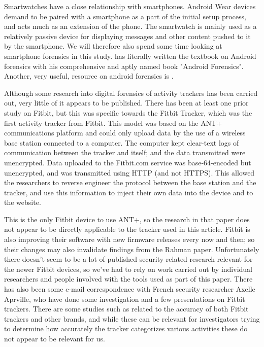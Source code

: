 \documentclass[a4paper,11pt,dvips]{article}
\begin{document}
Smartwatches have a close relationship with smartphones. Android Wear devices demand to be paired with a smartphone as a part of the initial setup process, and acts much as an extension of the phone. The smartwatch is mainly used as a relatively passive device for displaying messages and other content pushed to it by the smartphone. We will therefore also spend some time looking at smartphone forensics in this study. \cite{hoog2011android} has literally written the textbook on Android forensics with his comprehensive and aptly named book "Android Forensics". Another, very useful, resource on android forensics is \cite{vidas2011toward}.

Although some research into digital forensics of activity trackers has been carried out, very little of it appears to be published. There has been at least one prior study on Fitbit, but this was specific towards the Fitbit Tracker, which was the first activity tracker from Fitbit. This model was based on the ANT+ communications platform and could only upload data by the use of a wireless base station connected to a computer. The computer kept clear-text logs of communication between the tracker and itself; and the data transmitted were unencrypted. Data uploaded to the Fitbit.com service was base-64-encoded but unencrypted, and was transmitted using HTTP (and not HTTPS). This allowed the researchers to reverse engineer the protocol between the base station and the tracker, and use this information to inject their own data into the device and to the website. \citep{rahman2013fit}

This is the only Fitbit device to use ANT+, so the research in that paper does not appear to be directly applicable to the tracker used in this article. Fitbit is also improving their software with new firmware releases every now and then; so their changes may also invalidate findings from the Rahman paper. Unfortunately there doesn’t seem to be a lot of published security-related research relevant for the newer Fitbit devices, so we’ve had to rely on work carried out by individual researchers and people involved with the tools used as part of this paper. There has also been some e-mail correspondence with French security researcher Axelle Aprville, who have done some investigation and a few presentations on Fitbit trackers. There are some studies such as \cite{lee2014validity} related to the accuracy of both Fitbit trackers and other brands, and while these can be relevant for investigators trying to determine how accurately the tracker categorizes various activities these do not appear to be relevant for us.
\end{document}
